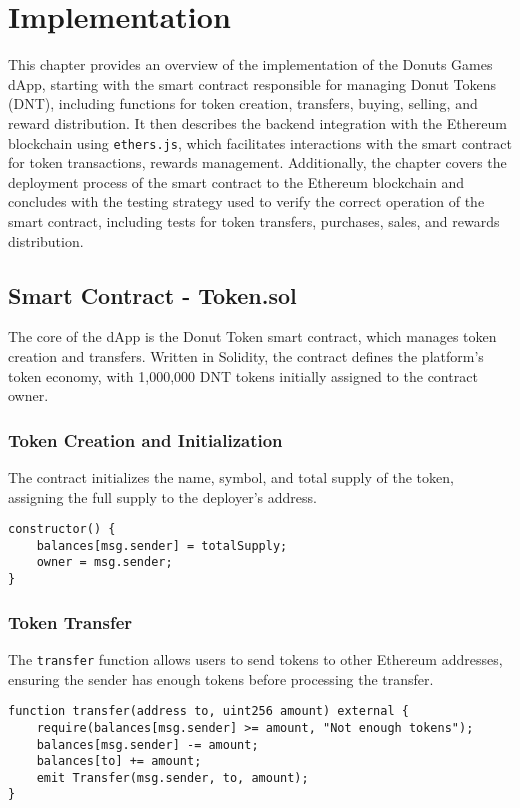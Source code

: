 \documentclass[../main.tex]{subfiles}
\begin{document}
\section{Implementation}\label{sec:implementation}

This chapter provides an overview of the implementation of the Donuts Games dApp, starting with the smart contract responsible for managing Donut Tokens (DNT), including functions for token creation, transfers, buying, selling, and reward distribution. It then describes the backend integration with the Ethereum blockchain using \texttt{ethers.js}, which facilitates interactions with the smart contract for token transactions, rewards management. Additionally, the chapter covers the deployment process of the smart contract to the Ethereum blockchain and concludes with the testing strategy used to verify the correct operation of the smart contract, including tests for token transfers, purchases, sales, and rewards distribution.


\subsection{Smart Contract - Token.sol}
The core of the dApp is the Donut Token smart contract, which manages token creation and transfers. Written in Solidity, the contract defines the platform’s token economy, with 1,000,000 DNT tokens initially assigned to the contract owner.

\subsubsection{Token Creation and Initialization}
The contract initializes the name, symbol, and total supply of the token, assigning the full supply to the deployer's address. 

\begin{verbatim}
constructor() {
    balances[msg.sender] = totalSupply;
    owner = msg.sender;
}
\end{verbatim}

\subsubsection{Token Transfer}
The \texttt{transfer} function allows users to send tokens to other Ethereum addresses, ensuring the sender has enough tokens before processing the transfer.

\begin{verbatim}
function transfer(address to, uint256 amount) external {
    require(balances[msg.sender] >= amount, "Not enough tokens");
    balances[msg.sender] -= amount;
    balances[to] += amount;
    emit Transfer(msg.sender, to, amount);
}
\end{verbatim}
\end{document}
